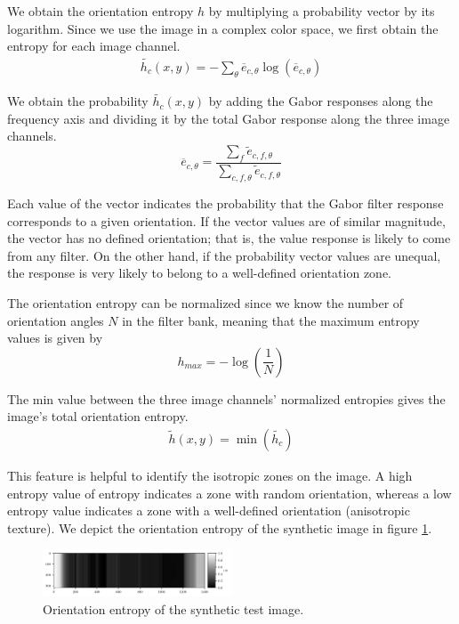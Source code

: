 \documentclass[journal]{IEEEtran}
\begin{document}
We obtain the orientation entropy $h$ by multiplying a probability vector by its logarithm. Since we use the image in a complex color space, we first obtain the entropy for each image channel.
\begin{gather}
    \widetilde{h_c}(x,y) = -\sum_{\theta} \overline{e}_{c, \theta} \log (\overline{e}_{c, \theta}) \label{eq:entropy_orient_ch}
\end{gather}

We obtain the probability $\widetilde{h_c}(x,y)$ by adding the Gabor responses along the frequency axis and dividing it by the total Gabor response along the three image channels.
\begin{equation}
	\overline{e}_{c, \theta} =  \frac{\sum_f \widetilde{e}_{c, f, \theta}}{\sum_{c, f, \theta}\widetilde{e}_{c, f, \theta} }  \label{eq:gabor_energy_ch_orient_prob}
\end{equation}

Each value of the vector indicates the probability that the Gabor filter response corresponds to a given orientation. If the vector values are of similar magnitude, the vector has no defined orientation; that is, the value response is likely to come from any filter. On the other hand, if the probability vector values are unequal, the response is very likely to belong to a well-defined orientation zone.

The orientation entropy can be normalized since we know the number of orientation angles $N$ in the filter bank, meaning that the maximum entropy values is given by 
\begin{equation}
    h_{max} = -\log\left(\frac{1}{N}\right) \label{eq:max_entropy_orient} 
\end{equation}

The min value between the three image channels' normalized entropies gives the image's total orientation entropy.
\begin{gather}
    \widetilde{h}(x,y) = \min(\widetilde{h_c}) \label{eq:entropy_orient}
\end{gather}

This feature is helpful to identify the isotropic zones on the image. A high entropy value of entropy indicates a zone with random orientation, whereas a low entropy value indicates a zone with a well-defined orientation (anisotropic texture). We depict the orientation entropy of the synthetic image in figure \ref{fig:entropy_orient_synth}.

\begin{figure}[!ht]
	\includegraphics[width=0.5\textwidth]{entropy_orient_synth}
    \caption{Orientation entropy of the synthetic test image.}
    \label{fig:entropy_orient_synth}
\end{figure}
\end{document}
